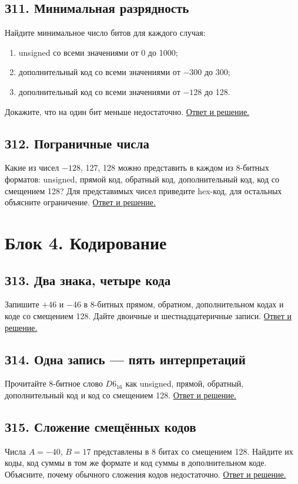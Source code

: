 \subsection*{З11. Минимальная разрядность}\label{task:z11}
Найдите минимальное число битов для каждого случая:
\begin{enumerate}
    \item unsigned со всеми значениями от 0 до 1000;
    \item дополнительный код со всеми значениями от $-300$ до 300;
    \item дополнительный код со всеми значениями от $-128$ до 128.
\end{enumerate}
Докажите, что на один бит меньше недостаточно.
\hyperref[ans:z11]{Ответ и решение.}

\subsection*{З12. Пограничные числа}\label{task:z12}
Какие из чисел $-128$, 127, 128 можно представить в каждом из 8-битных форматов: unsigned, прямой код, обратный код, дополнительный код, код со смещением 128? Для представимых чисел приведите hex-код, для остальных объясните ограничение.
\hyperref[ans:z12]{Ответ и решение.}

\section{Блок 4. Кодирование}
\subsection*{З13. Два знака, четыре кода}\label{task:z13}
Запишите $+46$ и $-46$ в 8-битных прямом, обратном, дополнительном кодах и коде со смещением 128. Дайте двоичные и шестнадцатеричные записи.
\hyperref[ans:z13]{Ответ и решение.}

\subsection*{З14. Одна запись --- пять интерпретаций}\label{task:z14}
Прочитайте 8-битное слово $D6_{16}$ как unsigned, прямой, обратный, дополнительный код и код со смещением 128.
\hyperref[ans:z14]{Ответ и решение.}

\subsection*{З15. Сложение смещённых кодов}\label{task:z15}
Числа $A=-40$, $B=17$ представлены в 8 битах со смещением 128. Найдите их коды, код суммы в том же формате и код суммы в дополнительном коде. Объясните, почему обычного сложения кодов недостаточно.
\hyperref[ans:z15]{Ответ и решение.}

